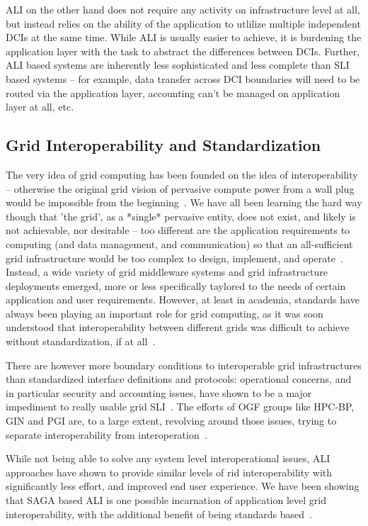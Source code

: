 \documentclass[10pt,conference,final,letterpaper,twoside,twocolumn,]{IEEEtran}
\begin{document}
 ALI on the other hand does not require any activity on infrastructure
 level at all, but instead relies on the ability of the application to
 utlilize multiple independent DCIs at the same time.  While ALI is
 usually easier to achieve, it is burdening the application layer
 with the task to abstract the differences between DCIs.  Further, ALI
 based systems are inherently less sophisticated and less complete
 than SLI based systems -- for example, data transfer across DCI
 boundaries will need to be routed via the application layer,
 accounting can't be managed on application layer at all, etc.


 \subsection*{Grid Interoperability and Standardization}

 The very idea of grid computing has been founded on the idea of
 interoperability -- otherwise the original grid vision of pervasive
 compute power from a wall plug would be impossible from the
 beginning~\cite{blueprint}.  We have all been learning the hard way
 though that 'the grid', as a *single* pervasive entity, does not
 exist, and likely is not achievable, nor desirable -- too different
 are the application requirements to computing (and data management,
 and communication) so that an all-sufficient grid infrastructure
 would be too complex to design, implement, and operate~\cite{ogsa-use-cases}.
 Instead, a wide variety of grid middleware systems and grid
 infrastructure deployments emerged, more or less specifically
 taylored to the needs of certain application and user requirements.
 However, at least in academia, standards have always been playing an
 important role for grid computing, as it was soon understood that
 interoperability between different grids was difficult to achieve
 without standardization, if at all~\cite{...}.

 There are however more boundary conditions to interoperable grid
 infrastructures than standardized interface definitions and
 protocols: operational concerns, and in particular security and
 accounting issues, have shown to be a major impediment to really
 usable grid SLI~\cite{gin-usecases}.  The efforts of OGF groups like
 HPC-BP, GIN and PGI are, to a large extent, revolving around those
 issues, trying to separate interoperability from
 interoperation~\cite{gin-papers, ogf-www}.

 While not being able to solve any system level interoperational
 issues, ALI approaches have shown to provide similar levels of rid
 interoperability with significantly less effort, and improved end
 user experience.  We have been showing that SAGA based ALI is one
 possible incarnation of application level grid interoperability, with
 the additional benefit of being standards based~\cite{saga-gin,
 mandelbrot-www}.
\end{document}
